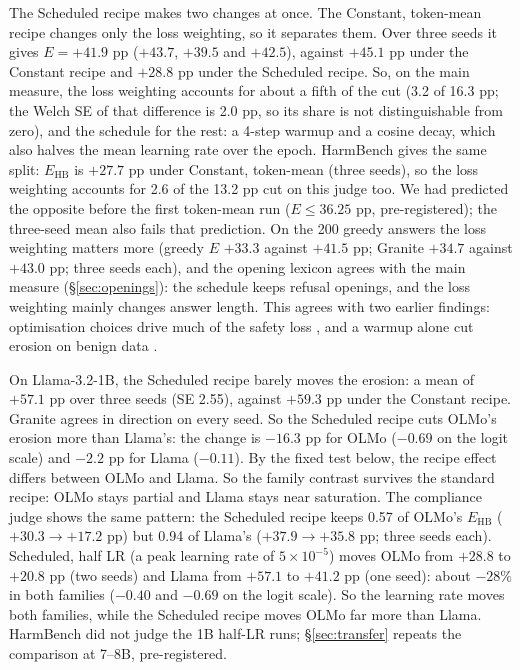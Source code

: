 \documentclass{article}
\newcommand{\Ehb}{E_{\mathrm{HB}}}
\begin{document}
The Scheduled recipe makes two changes at once. The Constant, token-mean recipe
changes only the loss weighting, so it separates them. Over three seeds it gives
$E = +41.9$ pp ($+43.7$, $+39.5$ and $+42.5$), against $+45.1$ pp under the
Constant recipe and $+28.8$ pp under the Scheduled recipe. So, on the main
measure, the loss weighting accounts for about a fifth of the cut (3.2 of
16.3 pp; the Welch SE of that difference is 2.0 pp, so its share is not
distinguishable from zero), and the schedule for the rest: a 4-step warmup and a
cosine decay, which also halves the mean learning rate over the epoch. HarmBench
gives the same split: $\Ehb$ is $+27.7$ pp under Constant, token-mean (three
seeds), so the loss weighting accounts for 2.6 of the 13.2 pp cut on this judge
too. We had
predicted the opposite before the first token-mean run ($E \le 36.25$ pp,
pre-registered); the three-seed mean also fails that prediction. On the 200
greedy answers the loss weighting matters more (greedy $E$ $+33.3$ against
$+41.5$ pp; Granite $+34.7$ against $+43.0$ pp; three seeds each), and the
opening lexicon agrees with the main measure (\S\ref{sec:openings}): the
schedule keeps refusal openings, and the loss weighting mainly changes answer
length. This agrees with two earlier findings: optimisation choices drive much
of the safety loss \citep{kim2025rethinking}, and a warmup alone cut erosion
on benign data \citep{qi2025shallow}.

On Llama-3.2-1B, the Scheduled recipe barely moves the erosion: a mean of
$+57.1$ pp over three seeds (SE 2.55), against $+59.3$ pp under the Constant
recipe. Granite agrees in direction on every seed. So the Scheduled recipe cuts
OLMo's erosion more than Llama's: the change is $-16.3$ pp for OLMo ($-0.69$ on
the logit scale) and $-2.2$ pp for Llama ($-0.11$). By the fixed test below, the
recipe effect differs between OLMo and Llama. So the family contrast survives
the standard recipe: OLMo stays partial and Llama stays near saturation. The
compliance judge shows the same pattern: the Scheduled recipe keeps 0.57 of
OLMo's $\Ehb$ ($+30.3 \to +17.2$ pp) but 0.94 of Llama's ($+37.9 \to +35.8$ pp;
three seeds each). Scheduled, half LR (a peak
learning rate of $5 \times 10^{-5}$) moves OLMo from $+28.8$ to $+20.8$ pp (two
seeds) and Llama from $+57.1$ to $+41.2$ pp (one seed): about $-28\%$ in both
families ($-0.40$ and $-0.69$ on the logit scale). So the learning rate moves
both families, while the Scheduled recipe moves OLMo far more than Llama.
HarmBench did not judge the 1B half-LR runs; \S\ref{sec:transfer} repeats the
comparison at 7--8B, pre-registered.
\end{document}
